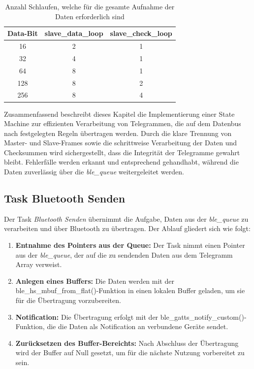 \begin{table}[H]
    \centering
    \begin{tabular}{c|c|c}
        Data-Bit & slave\_data\_loop & slave\_check\_loop\\
        \hline
        \hline
        16 & 2 & 1\\
        \hline
        32 & 4 & 1\\
        \hline
        64 & 8 & 1\\
        \hline
        128 & 8 & 2\\
        \hline
        256 & 8 & 4\\
        \hline
    \end{tabular}
    \caption{Anzahl Schlaufen, welche für die gesamte Aufnahme der Daten erforderlich sind}
    \label{tab:SchlaufenSlaveLoops}
\end{table}


Zusammenfassend beschreibt dieses Kapitel die Implementierung einer State Machine zur effizienten Verarbeitung von Telegrammen, die auf dem Datenbus nach festgelegten Regeln übertragen werden. Durch die klare Trennung von Master- und Slave-Frames sowie die schrittweise Verarbeitung der Daten und Checksummen wird sichergestellt, dass die Integrität der Telegramme gewahrt bleibt. Fehlerfälle werden erkannt und entsprechend gehandhabt, während die Daten zuverlässig über die \textit{ble\_queue} weitergeleitet werden.


\subsection{Task Bluetooth Senden}
\label{sub:TaskBTSend}

Der Task \textit{Bluetooth Senden} übernimmt die Aufgabe, Daten aus der \textit{ble\_queue} zu verarbeiten und über Bluetooth zu übertragen. Der Ablauf gliedert sich wie folgt:

\begin{enumerate}
    \item \textbf{Entnahme des Pointers aus der Queue:}  
    Der Task nimmt einen Pointer aus der \textit{ble\_queue}, der auf die zu sendenden Daten aus dem Telegramm Array verweist.
    
    \item \textbf{Anlegen eines Buffers:}  
    Die Daten werden mit der ble\_hs\_mbuf\_from\_flat()-Funktion in einen lokalen Buffer geladen, um sie für die Übertragung vorzubereiten.
    
    \item \textbf{Notification:}  
    Die Übertragung erfolgt mit der ble\_gatts\_notify\_custom()- Funktion, die die Daten als Notification an verbundene Geräte sendet.
    
    \item \textbf{Zurücksetzen des Buffer-Bereichts:}  
    Nach Abschluss der Übertragung wird der Buffer auf Null gesetzt, um für die nächste Nutzung vorbereitet zu sein.
\end{enumerate}

